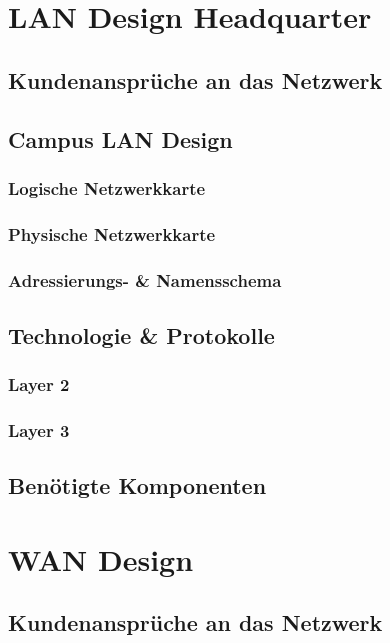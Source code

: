 \section{LAN Design Headquarter}

\subsection{Kundenansprüche an das Netzwerk}

\subsection{Campus LAN Design}

\subsubsection{Logische Netzwerkkarte}
\subsubsection{Physische Netzwerkkarte}

\subsubsection{Adressierungs- \& Namensschema}

\subsection{Technologie \& Protokolle}
\subsubsection{Layer 2}
\subsubsection{Layer 3}

\subsection{Benötigte Komponenten}

\section{WAN Design}

\subsection{Kundenansprüche an das Netzwerk}

